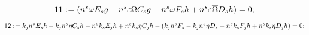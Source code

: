 \documentclass[11pt]{article}
\def\specialcolon{\mathrel{\mathop{:}}\hspace{-.5em}}
\renewcommand{\bar}[1]{\overline{#1}}
\begin{document}
\begin{dmath*}[compact, spread=2pt]
11\specialcolon{}= ({n}^{s} \omega {E}_{s} g - {n}^{s} \varepsilon \Omega {C}_{s} g - {n}^{s} \omega {F}_{s} h + {n}^{s} \varepsilon \bar \Omega {D}_{s} h) = 0;
\end{dmath*}

\begin{dmath*}[compact, spread=2pt]
12\specialcolon{}= {k}_{j} {n}^{s} {E}_{s} h - {k}_{j} {n}^{s} \eta {C}_{s} h - {n}^{s} {k}_{s} {E}_{j} h + {n}^{s} {k}_{s} \eta {C}_{j} h - ({k}_{j} {n}^{s} {F}_{s} - {k}_{j} {n}^{s} \eta {D}_{s} - {n}^{s} {k}_{s} {F}_{j} h + {n}^{s} {k}_{s} \eta {D}_{j} h) = 0;
\end{dmath*}
\end{document}
